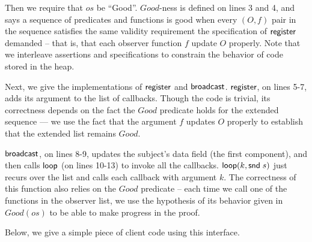 Then we require that $os$ be ``Good''. $Good$-ness is defined on lines
3 and 4, and says a sequence of predicates and functions is good when
every $(O,f)$ pair in the sequence satisfies the same validity
requirement the specification of $\mathsf{register}$ demanded -- that
is, that each observer function $f$ update $O$ properly.  Note that we
interleave assertions and specifications to constrain the behavior of
code stored in the heap.

Next, we give the implementations of $\mathsf{register}$ and
$\mathsf{broadcast}$. $\mathsf{register}$, on lines 5-7, adds its
argument to the list of callbacks. Though the code is trivial, its
correctness depends on the fact the $Good$ predicate holds for the
extended sequence --- we use the fact that the argument $f$ updates 
$O$ properly to establish that the extended list remains $Good$. 

$\mathsf{broadcast}$, on lines 8-9, updates the subject's data field
(the first component), and then calls $\mathsf{loop}$ (on lines 10-13)
to invoke all the callbacks. $\mathsf{loop}(k, \mathsf{snd}\; s)$ just recurs
over the list and calls each callback with argument $k$. The
correctness of this function also relies on the $Good$ predicate --
each time we call one of the functions in the observer list, we use
the hypothesis of its behavior given in $Good(os)$ to be able to make
progress in the proof.


Below, we give a simple piece of client code using this interface.



